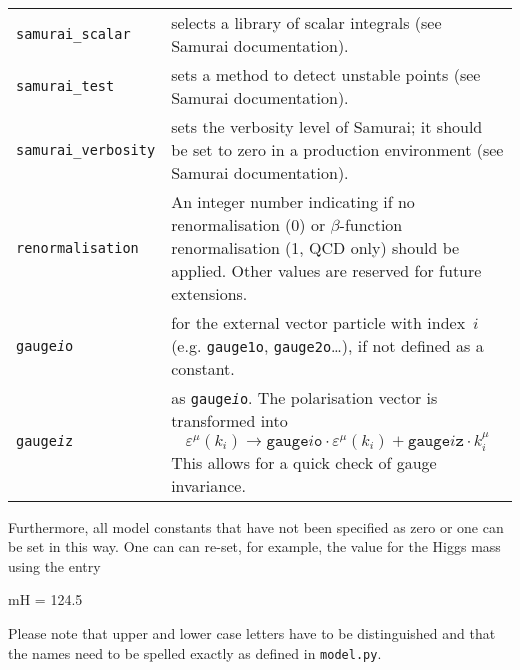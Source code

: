 \documentclass[11pt,a4paper]{refrep}
\newcommand{\samurai}{{\sc Samurai}\xspace}
\begin{document}
\begin{tabular}{l@{\quad}p{}}
   \texttt{samurai\_scalar} & selects a library of scalar integrals
   (see \samurai documentation).\\
   \texttt{samurai\_test} & sets a method to detect unstable points
   (see \samurai documentation). \\
   \texttt{samurai\_verbosity} & sets the verbosity level of
   \samurai; it should be set to zero in a production environment
   (see \samurai documentation).\\
   \texttt{renormalisation} & An integer number indicating if no
   renormalisation (0) or $\beta$-function renormalisation (1,
   QCD only) should be applied. Other values are reserved for future
   extensions. \\
   \texttt{gauge\textit{i}o} & for the external vector particle with
   index~$i$ (e.g. \texttt{gauge1o}, \texttt{gauge2o}\ldots),
   if not defined as a constant. \\
   \texttt{gauge\textit{i}z} & as \texttt{gauge\textit{i}o}.
   The polarisation vector is transformed into
   \begin{displaymath}
   \varepsilon^\mu(k_i)\to\mathtt{gauge\mathit{i}o}\cdot\varepsilon^\mu(k_i)
      + \mathtt{gauge\mathit{i}z}\cdot k_i^\mu
   \end{displaymath}
   This allows for a quick check of gauge invariance.
\end{tabular}
Furthermore, all model constants that have not been specified as zero or one
can be set in this way. 
One can can re-set, for example, the value for the Higgs mass using the entry
\begin{example}
mH = 124.5
\end{example}
Please note that upper and lower case letters have to be distinguished
and that the names need to be spelled exactly as defined in \texttt{model.py}.
\end{document}
